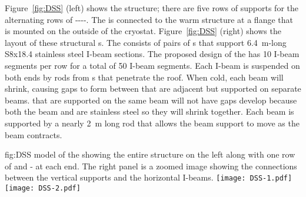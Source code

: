 Figure~\ref{fig:DSS} (left) shows the  structure; there are
five rows of supports for the alternating rows of
----.  The
 is connected to the warm structure at a flange that is
mounted on the outside of the cryostat.  Figure~\ref{fig:DSS} (right)
shows the layout of these structural \fdth{}s.  The 
consists of pairs of \fdth{}s that support \SI{6.4}{m}-long
S8x18.4 stainless steel I-beam sections. The proposed design of the
 has \num{10} I-beam segments per row for a total of
\num{50} I-beam segments. Each I-beam is suspended on both ends by
rods from \fdth{}s that penetrate the roof.  %
When cold, each beam will shrink, causing gaps to form between
 that are adjacent but supported on separate beams.
 that are supported on the same beam will not have gaps
develop because both the beam and  are stainless steel so
they will shrink together.  Each beam is supported by a nearly
\SI{2}{m} long rod that allows the beam support to move as the beam
contracts.

\begin{dunefigure}{fig:DSS}
  {\threed model of the  showing the entire
  structure on the left along with one row of  and
  - at each end. The right panel is a zoomed image
  showing the connections between the vertical supports and the
  horizontal I-beams.}
\texttt{[image: DSS-1.pdf]}
 \texttt{[image: DSS-2.pdf]}
\end{dunefigure}



